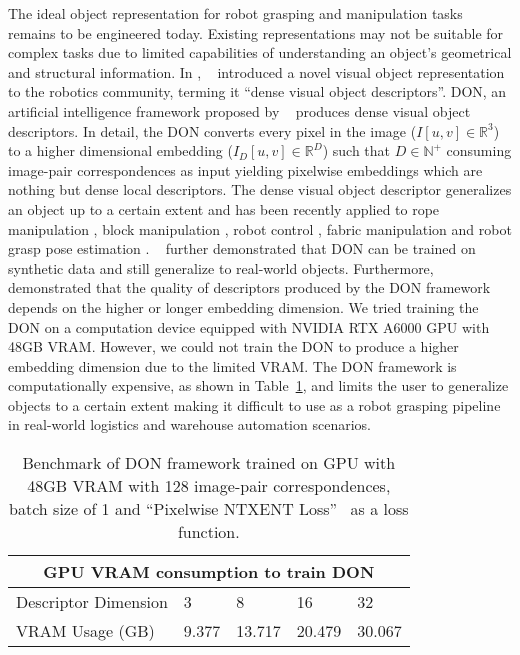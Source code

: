 The ideal object representation for robot grasping and manipulation tasks remains to be engineered today.
Existing representations may not be suitable for complex tasks due to limited capabilities of understanding an object's geometrical and structural information.
In \citeyear{florence2018dense}, \citeauthor{florence2018dense}~\cite{florence2018dense} introduced a novel visual
object representation to the robotics community,  terming it ``dense visual object descriptors''. DON, an artificial intelligence
framework proposed by
~\cite{florence2018dense} produces dense visual object descriptors. In detail, the DON converts every pixel in the
image ($I[u, v] \in \mathbb{R}^3$) to a higher dimensional embedding ($I_D[u, v] \in \mathbb{R}^D$) such that $D \in \mathbb{N}^+$ consuming
image-pair correspondences as input yielding pixelwise embeddings
which are nothing but dense local descriptors.
The dense visual object descriptor generalizes an object up to a certain extent and has been recently
applied to rope manipulation \cite{rope-manipulation},
block manipulation \cite{block-manipulation}, robot control \cite{florence2019self}, fabric manipulation \cite{fabric-manipulation} and
robot grasp pose estimation \parencites{kupcsik2021supervised}{adrian2022efficient}. \citeauthor{adrian2022efficient}~\cite{adrian2022efficient}
further demonstrated that DON can be trained on synthetic data and still generalize to real-world objects. Furthermore, \citeauthor{adrian2022efficient}~\cite{adrian2022efficient} demonstrated that
the quality of descriptors produced by the DON framework depends on the higher or longer embedding dimension. We tried training the DON on a computation
device equipped with NVIDIA RTX A6000 GPU with 48GB VRAM. However, we could not train the DON to produce a higher embedding dimension due to the limited VRAM.
The DON framework is computationally expensive, as shown in Table~\ref{table:don_gpu_bechmark}, and limits the user to generalize objects to a certain extent making it
difficult to use as a robot grasping pipeline in real-world logistics and warehouse automation scenarios.

\begin{table}[htb]
    \caption{Benchmark of DON framework trained on GPU with 48GB VRAM with 128 image-pair correspondences, batch size of 1 and ``Pixelwise NTXENT Loss''~\cite{adrian2022efficient} as a loss function.}
    \label{table:don_gpu_bechmark}
    \centering
    \begin{tabular}{lllll}
        \toprule
        \multicolumn{5}{c}{GPU VRAM consumption to train DON}   \\
        \midrule
        Descriptor Dimension & 3     & 8      & 16     & 32     \\
        VRAM Usage (GB)      & 9.377 & 13.717 & 20.479 & 30.067 \\
        \bottomrule
    \end{tabular}
\end{table}


